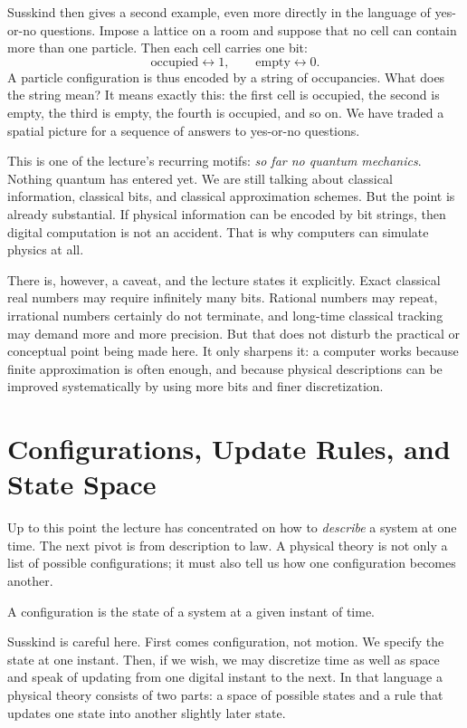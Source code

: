 Susskind then gives a second example, even more directly in the language of yes-or-no questions. Impose a lattice on a room and suppose that no cell can contain more than one particle. Then each cell carries one bit:
\begin{equation}
\text{occupied} \longleftrightarrow 1,
\qquad
\text{empty} \longleftrightarrow 0.
\end{equation}
A particle configuration is thus encoded by a string of occupancies. What does the string mean? It means exactly this: the first cell is occupied, the second is empty, the third is empty, the fourth is occupied, and so on. We have traded a spatial picture for a sequence of answers to yes-or-no questions.

This is one of the lecture's recurring motifs: \emph{so far no quantum mechanics}. Nothing quantum has entered yet. We are still talking about classical information, classical bits, and classical approximation schemes. But the point is already substantial. If physical information can be encoded by bit strings, then digital computation is not an accident. That is why computers can simulate physics at all.

There is, however, a caveat, and the lecture states it explicitly. Exact classical real numbers may require infinitely many bits. Rational numbers may repeat, irrational numbers certainly do not terminate, and long-time classical tracking may demand more and more precision. But that does not disturb the practical or conceptual point being made here. It only sharpens it: a computer works because finite approximation is often enough, and because physical descriptions can be improved systematically by using more bits and finer discretization.

\section{Configurations, Update Rules, and State Space}

Up to this point the lecture has concentrated on how to \emph{describe} a system at one time. The next pivot is from description to law. A physical theory is not only a list of possible configurations; it must also tell us how one configuration becomes another.

\begin{definition}
A configuration is the state of a system at a given instant of time.
\end{definition}

Susskind is careful here. First comes configuration, not motion. We specify the state at one instant. Then, if we wish, we may discretize time as well as space and speak of updating from one digital instant to the next. In that language a physical theory consists of two parts: a space of possible states and a rule that updates one state into another slightly later state.

